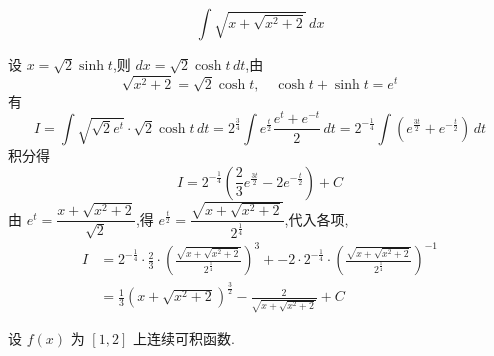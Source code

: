 \begin{questions}
    \question
    \[
    \int \sqrt{x + \sqrt{x^2+2}} \, dx
    \]
    \begin{solution}
        设 $x = \sqrt{2} \sinh t$,则 $dx = \sqrt{2} \cosh t \, dt$,由 
        \[
        \sqrt{x^2+2} = \sqrt{2} \cosh t, \quad \cosh t + \sinh t = e^t
        \]
        有
        \[
        I = \int \sqrt{\sqrt{2}e^t} \cdot \sqrt{2}\cosh t \, dt = 2^{\frac{3}{4}} \int e^{\frac{t}{2}} \frac{e^t + e^{-t}}{2} \, dt = 2^{-\frac{1}{4}} \int \left( e^{\frac{3t}{2}} + e^{-\frac{t}{2}} \right) \, dt
        \]
        积分得
        \[
        I = 2^{-\frac{1}{4}} \left( \frac{2}{3}e^{\frac{3t}{2}} - 2e^{-\frac{t}{2}} \right) + C
        \]
        由 $e^t = \dfrac{x + \sqrt{x^2+2}}{\sqrt{2}}$,得 $e^{\frac{t}{2}} = \dfrac{\sqrt{x + \sqrt{x^2+2}}}{2^{\frac{1}{4}}}$,代入各项,
        \begin{align*}
        I &= 2^{-\frac{1}{4}} \cdot \frac{2}{3} \cdot \left( \frac{\sqrt{x + \sqrt{x^2+2}}}{2^{\frac{1}{4}}} \right)^3 + -2 \cdot 2^{-\frac{1}{4}} \cdot \left( \frac{\sqrt{x + \sqrt{x^2+2}}}{2^{\frac{1}{4}}} \right)^{-1} \\
        &= \frac{1}{3}(x + \sqrt{x^2+2})^{\frac{3}{2}} - \frac{2}{\sqrt{x + \sqrt{x^2+2}}} + C
        \end{align*}
    \end{solution}

    \question 设 $f(x)$ 为 $[1,2]$ 上连续可积函数.

\end{questions}
